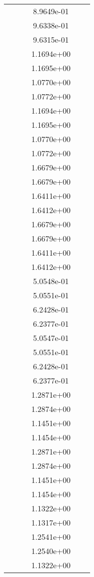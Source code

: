 \begin{xltabular}{\textwidth}{r|rS[table-format=1.3e+2]S[table-format=1.4e+2]S[table-format=1.4e+2]S[table-format=-1.5]}
&  &  & 8.9649e-01 & & \\
&  &  & 9.6338e-01 & & \\
&  &  & 9.6315e-01 & & \\
&  &  & 1.1694e+00 & & \\
&  &  & 1.1695e+00 & & \\
&  &  & 1.0770e+00 & & \\
&  &  & 1.0772e+00 & & \\
&  &  & 1.1694e+00 & & \\
&  &  & 1.1695e+00 & & \\
&  &  & 1.0770e+00 & & \\
&  &  & 1.0772e+00 & & \\
&  &  & 1.6679e+00 & & \\
&  &  & 1.6679e+00 & & \\
&  &  & 1.6411e+00 & & \\
&  &  & 1.6412e+00 & & \\
&  &  & 1.6679e+00 & & \\
&  &  & 1.6679e+00 & & \\
&  &  & 1.6411e+00 & & \\
&  &  & 1.6412e+00 & & \\
&  &  & 5.0548e-01 & & \\
&  &  & 5.0551e-01 & & \\
&  &  & 6.2428e-01 & & \\
&  &  & 6.2377e-01 & & \\
&  &  & 5.0547e-01 & & \\
&  &  & 5.0551e-01 & & \\
&  &  & 6.2428e-01 & & \\
&  &  & 6.2377e-01 & & \\
&  &  & 1.2871e+00 & & \\
&  &  & 1.2874e+00 & & \\
&  &  & 1.1451e+00 & & \\
&  &  & 1.1454e+00 & & \\
&  &  & 1.2871e+00 & & \\
&  &  & 1.2874e+00 & & \\
&  &  & 1.1451e+00 & & \\
&  &  & 1.1454e+00 & & \\
&  &  & 1.1322e+00 & & \\
&  &  & 1.1317e+00 & & \\
&  &  & 1.2541e+00 & & \\
&  &  & 1.2540e+00 & & \\
&  &  & 1.1322e+00 & & \\

\end{xltabular}
